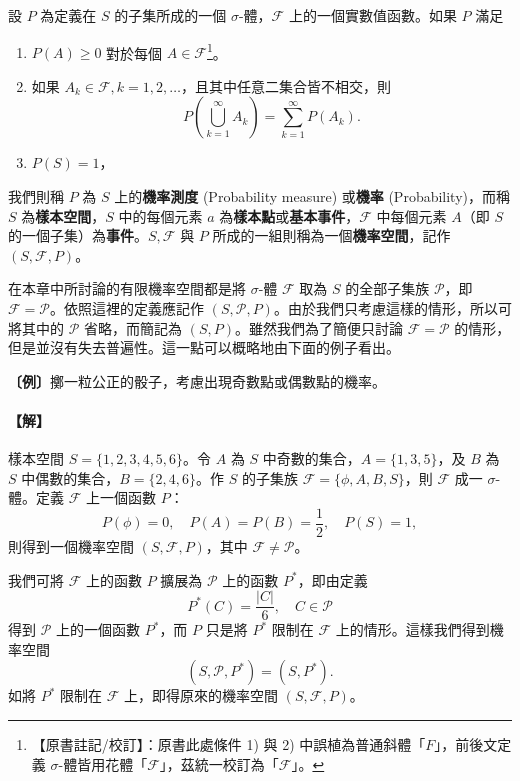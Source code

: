 設 $P$ 為定義在 $S$ 的子集所成的一個 $\sigma$-體，$\mathscr{F}$ 上的一個實數值函數。如果 $P$ 滿足
\begin{enumerate}[label=\arabic*)]
  \item $P(A) \ge 0$ 對於每個 $A \in \mathscr{F}$\label{note:b5-ch4-p138-f-font}\footnote{【原書註記/校訂】：原書此處條件 1) 與 2) 中誤植為普通斜體「$F$」，前後文定義 $\sigma$-體皆用花體「$\mathscr{F}$」，茲統一校訂為「$\mathscr{F}$」。}。
  \item 如果 $A_k \in \mathscr{F}, k = 1, 2, \dots$，且其中任意二集合皆不相交，則
  \[
  P\left( \bigcup_{k=1}^\infty A_k \right) = \sum_{k=1}^\infty P(A_k).
  \]
  \item $P(S) = 1$，
\end{enumerate}
我們則稱 $P$ 為 $S$ 上的\textbf{機率測度} (Probability measure) 或\textbf{機率} (Probability)，而稱 $S$ 為\textbf{樣本空間}，$S$ 中的每個元素 $a$ 為\textbf{樣本點}或\textbf{基本事件}，$\mathscr{F}$ 中每個元素 $A$（即 $S$ 的一個子集）為\textbf{事件}。$S, \mathscr{F}$ 與 $P$ 所成的一組則稱為一個\textbf{機率空間}，記作 $(S, \mathscr{F}, P)$。

在本章中所討論的有限機率空間都是將 $\sigma$-體 $\mathscr{F}$ 取為 $S$ 的全部子集族 $\mathscr{P}$，即 $\mathscr{F} = \mathscr{P}$。依照這裡的定義應記作 $(S, \mathscr{P}, P)$。由於我們只考慮這樣的情形，所以可將其中的 $\mathscr{P}$ 省略，而簡記為 $(S, P)$。雖然我們為了簡便只討論 $\mathscr{F} = \mathscr{P}$ 的情形，但是並沒有失去普遍性。這一點可以概略地由下面的例子看出。

\medskip
\noindent\textbf{〔例〕}\quad 擲一粒公正的骰子，考慮出現奇數點或偶數點的機率。
\paragraph{【解】}
樣本空間 $S = \{1, 2, 3, 4, 5, 6\}$。令 $A$ 為 $S$ 中奇數的集合，$A = \{1, 3, 5\}$，及 $B$ 為 $S$ 中偶數的集合，$B = \{2, 4, 6\}$。作 $S$ 的子集族 $\mathscr{F} = \{\phi, A, B, S\}$，則 $\mathscr{F}$ 成一 $\sigma$-體。定義 $\mathscr{F}$ 上一個函數 $P$：
\[
P(\phi) = 0, \quad P(A) = P(B) = \frac{1}{2}, \quad P(S) = 1,
\]
則得到一個機率空間 $(S, \mathscr{F}, P)$，其中 $\mathscr{F} \neq \mathscr{P}$。

我們可將 $\mathscr{F}$ 上的函數 $P$ 擴展為 $\mathscr{P}$ 上的函數 $P^*$，即由定義
\[
P^*(C) = \frac{|C|}{6}, \quad C \in \mathscr{P}
\]
得到 $\mathscr{P}$ 上的一個函數 $P^*$，而 $P$ 只是將 $P^*$ 限制在 $\mathscr{F}$ 上的情形。這樣我們得到機率空間
\[
(S, \mathscr{P}, P^*) = (S, P^*).
\]
如將 $P^*$ 限制在 $\mathscr{F}$ 上，即得原來的機率空間 $(S, \mathscr{F}, P)$。


